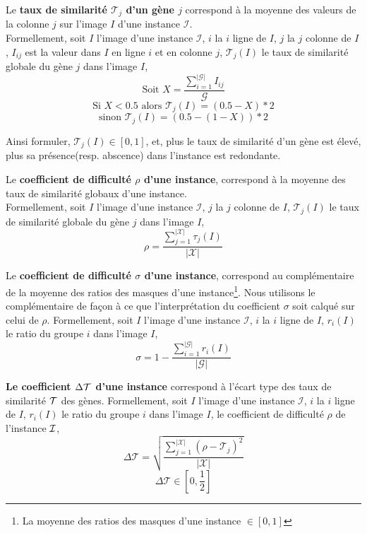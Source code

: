\begin{definition}
Le \textbf{taux de similarité $\mathcal{T}_j$ d'un gène $j$} correspond à la moyenne des valeurs de la colonne $j$ sur l'image $I$ d'une instance $\mathcal{I}$.\\
Formellement, soit $I$ l'image d'une instance $\mathcal{I}$, $i$ la $i$ ligne de $I$, $j$ la $j$ colonne de $I$, $I_{ij}$ est la valeur dans $I$ en ligne $i$ et en colonne $j$, $\mathcal{T}_j(I)$ le taux de similarité globale du gène $j$ dans l'image $I$,
$$ \text{Soit } X=\frac{\sum_{i=1}^{|\mathcal{G}|} I_{ij}}{\mathcal{G}} $$ 
$$\text{Si } X<0.5 \text{ alors } \mathcal{T}_j(I)=(0.5-X)*2 $$
$$\text{sinon }\mathcal{T}_j(I)=(0.5-(1-X))*2$$ 
\end{definition}
Ainsi formuler, $\mathcal{T}_j(I) \in [0,1]$, et, plus le taux de similarité d'un gène est élevé, plus sa présence(resp. abscence) dans l'instance est redondante.

\begin{definition}
Le \textbf{coefficient de difficulté $\rho$ d'une instance}, correspond à la moyenne des taux de similarité globaux d'une instance.\\
Formellement, soit $I$ l'image d'une instance $\mathcal{I}$, $j$ la $j$ colonne de $I$, $\mathcal{T}_j(I)$ le taux de similarité globale du gène $j$ dans l'image $I$,
$$ \rho=\frac{\sum_{j=1}^{|\mathcal{X}|}\tau_j(I)}{|\mathcal{X}|} $$
\end{definition}

\begin{definition}
Le \textbf{coefficient de difficulté $\sigma$ d'une instance}, correspond au complémentaire de la moyenne des ratios des masques d'une instance\footnote{La moyenne des ratios des masques d'une instance $\in [0,1]$ }. Nous utilisons le complémentaire de façon à ce que l'interprétation du coefficient $\sigma$ soit calqué sur celui de $\rho$.
Formellement, soit $I$ l'image d'une instance $\mathcal{I}$, $i$ la $i$ ligne de $I$, $r_i(I)$ le ratio du groupe $i$ dans l'image $I$,
$$ \sigma=1-\frac{\sum_{i=1}^{|\mathcal{G}|}r_i(I)} {|\mathcal{G}|} $$
\end{definition}

\begin{definition}
\textbf{Le coefficient $\Delta\cal{T}$ d'une instance} correspond à l'écart type des taux de similarité $\cal{T}$ des gènes.
Formellement, soit $I$ l'image d'une instance $\mathcal{I}$, $i$ la $i$ ligne de $I$, $r_i(I)$ le ratio du groupe $i$ dans l'image $I$, le coefficient de difficulté $\rho$ de l'instance $\cal{I}$, 
$$\Delta\mathcal{T}=\sqrt{\frac{\sum_{j=1}^{|\mathcal{X}|} (\rho-\mathcal{T}_j)^2}{|\mathcal{X}|}}$$
$$\Delta\mathcal{T} \in [0,\frac{1}{2}]$$
\end{definition}

